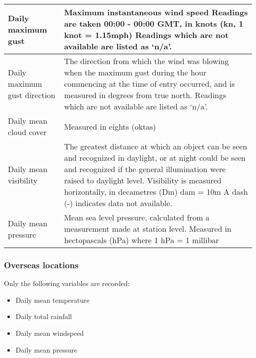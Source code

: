 \begin{tabular}{|p{5.5cm}|p{11.5cm}|}
    \hline
    Daily maximum gust              & Maximum instantaneous wind speed \newline Readings are taken 00:00 - 00:00 GMT, in knots (kn, 1 knot = 1.15mph) \newline
    Readings which are not available are listed as `n/a'.                                                                                                                                                                                                \\
    \hline
    Daily maximum gust direction    & The direction from which the wind was blowing when the maximum gust during the hour commencing at the time of entry occurred, and is measured in degrees from true north.  \newline
    Readings which are not available are listed as `n/a'.                                                                                                                                                                                                \\
    \hline
    Daily mean cloud cover          & Measured in eights (oktas)                                                                                                                                                                                         \\
    \hline
    Daily mean visibility           & The greatest distance at which an object can be seen and recognized in daylight, or at night could be seen and recognized if the general illumination were raised to daylight level.
    \newline Visibility is measured horizontally, in decametres (Dm) dam = 10m \newline A dash (-) indicates data not available.
    \\
    \hline
    Daily mean pressure             & Mean sea level pressure, calculated from a measurement made at station level. \newline Measured in hectopascals (hPa) 	where 1 hPa = 1 millibar
    \\
    \hline
\end{tabular}

\subsubsection{Overseas locations}
Only the following variables are recorded:
\begin{itemize}
    \item Daily mean temperature
    \item Daily total rainfall
    \item Daily mean windspeed
    \item Daily mean pressure
\end{itemize}

